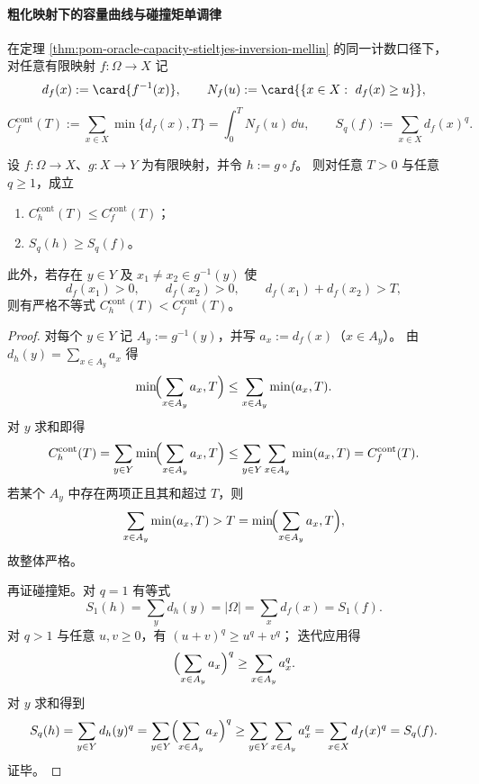 \paragraph{粗化映射下的容量曲线与碰撞矩单调律}
在定理 \ref{thm:pom-oracle-capacity-stieltjes-inversion-mellin} 的同一计数口径下，
对任意有限映射 \(f:\Omega\to X\) 记
\[
d_f(x):=\card{f^{-1}(x)},\qquad
N_f(u):=\card{\{x\in X:\ d_f(x)\ge u\}},
\]
\[
C_f^{\mathrm{cont}}(T):=\sum_{x\in X}\min\{d_f(x),T\}
=\int_0^T N_f(u)\,\dd u,\qquad
S_q(f):=\sum_{x\in X}d_f(x)^q.
\]



\begin{theorem}[容量曲线的数据处理不等式与碰撞矩的反向单调律]\label{thm:pom-capacity-collision-data-processing}
设 \(f:\Omega\to X\)、\(g:X\to Y\) 为有限映射，并令 \(h:=g\circ f\)。
则对任意 \(T>0\) 与任意 \(q\ge 1\)，成立
\begin{enumerate}
  \item \(C_h^{\mathrm{cont}}(T)\le C_f^{\mathrm{cont}}(T)\)；
  \item \(S_q(h)\ge S_q(f)\)。
\end{enumerate}
此外，若存在 \(y\in Y\) 及 \(x_1\neq x_2\in g^{-1}(y)\) 使
\[
d_f(x_1)>0,\qquad d_f(x_2)>0,\qquad d_f(x_1)+d_f(x_2)>T,
\]
则有严格不等式 \(C_h^{\mathrm{cont}}(T)<C_f^{\mathrm{cont}}(T)\)。
\end{theorem}
\begin{proof}
对每个 \(y\in Y\) 记 \(A_y:=g^{-1}(y)\)，并写 \(a_x:=d_f(x)\)（\(x\in A_y\)）。
由 \(d_h(y)=\sum_{x\in A_y}a_x\) 得
\[
\min\!\Bigl(\sum_{x\in A_y}a_x,T\Bigr)\le \sum_{x\in A_y}\min(a_x,T).
\]
对 \(y\) 求和即得
\[
C_h^{\mathrm{cont}}(T)
=\sum_{y\in Y}\min\!\Bigl(\sum_{x\in A_y}a_x,T\Bigr)
\le \sum_{y\in Y}\sum_{x\in A_y}\min(a_x,T)
=C_f^{\mathrm{cont}}(T).
\]
若某个 \(A_y\) 中存在两项正且其和超过 \(T\)，则
\[
\sum_{x\in A_y}\min(a_x,T)>T=\min\!\Bigl(\sum_{x\in A_y}a_x,T\Bigr),
\]
故整体严格。

再证碰撞矩。对 \(q=1\) 有等式
\[
S_1(h)=\sum_{y}d_h(y)=|\Omega|=\sum_{x}d_f(x)=S_1(f).
\]
对 \(q>1\) 与任意 \(u,v\ge 0\)，有 \((u+v)^q\ge u^q+v^q\)；
迭代应用得
\[
\Bigl(\sum_{x\in A_y}a_x\Bigr)^q\ge \sum_{x\in A_y}a_x^q.
\]
对 \(y\) 求和得到
\[
S_q(h)=\sum_{y\in Y}d_h(y)^q
=\sum_{y\in Y}\Bigl(\sum_{x\in A_y}a_x\Bigr)^q
\ge \sum_{y\in Y}\sum_{x\in A_y}a_x^q
=\sum_{x\in X}d_f(x)^q
=S_q(f).
\]
证毕。
\end{proof}

